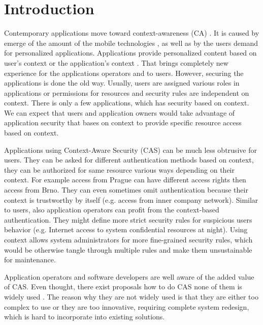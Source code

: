 \documentclass{sig-alternate}
\begin{document}



\section{Introduction}
Contemporary applications move toward context-awareness (CA) \cite{context,tomas1}. It is caused by emerge of the amount of the mobile technologies \cite{mobilecontext}, as well as by the users demand for personalized applications. Applications provide personalized content based on user's context or the application's context \cite{personalizedcontext}. That brings completely new experience for the applications operators and to users. However, securing the applications is done the old way. Usually, users are assigned various roles in applications or permissions for resources and security rules are independent on context. There is only a few applications, which has security based on context. We can expect that users and application owners would take advantage of application security that bases on context to provide specific resource access based on context.

Applications using Context-Aware Security (CAS) can be much less obtrusive for users. They can be asked for different authentication methods based on context, they can be authorized for same resource various ways depending on their context. For example access from Prague can have different access rights then access from Brno. They can even sometimes omit authentication because their context is trustworthy by itself (e.g. access from inner company network). Similar to users, also application operators can profit from the context-based authentication. They might define more strict security rules for suspicious users behavior (e.g. Internet access to system confidential resources at night). Using context allows system administrators for more fine-grained security rules, which would be otherwise tangle through multiple rules and make them unsustainable for maintenance. 

Application operators and software developers are well aware of the added value of CAS. Even thought, there exist proposals how to do CAS none of them is widely used \cite{grbac,envroles,contextroles,contextaccess,contextawarerbac,xorbac,genericcontext,ubiscom,hung,wendong,eacl,contextAwareMobile}. The reason why they are not widely used is that they are either too complex to use or they are too innovative, requiring complete system redesign, which is hard to incorporate into existing solutions.
\end{document}
